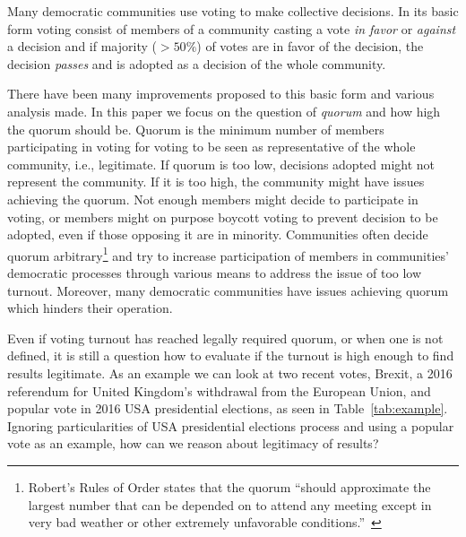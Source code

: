 \documentclass[chi_draft]{sigchi}
\begin{document}
Many democratic communities use voting to make collective decisions.
In its basic form voting consist of members of a community casting a vote \emph{in favor} or \emph{against} a decision and if
majority ($> 50\%$) of votes are in favor of the decision, the decision \emph{passes} and is adopted as a decision
of the whole community.

There have been many improvements proposed to this basic form and various analysis made.
In this paper we focus on the question of \emph{quorum} and how high the quorum should be.
Quorum is the minimum number of members participating in voting for voting to be seen as representative of the whole
community, i.e., legitimate.
If quorum is too low, decisions adopted might not represent the community.
If it is too high, the community might have issues achieving the quorum.
Not enough members might decide to participate in voting, or members might on purpose boycott voting to
prevent decision to be adopted, even if those opposing it are in minority.
Communities often decide quorum arbitrary\footnote{Robert's Rules of Order states that the quorum
``should approximate the largest number that can be depended on to attend any meeting except in very bad weather
or other extremely unfavorable conditions.''~\cite{roberts}}
and try to increase participation of members in communities' democratic processes through various means
to address the issue of too low turnout.
Moreover, many democratic communities have issues achieving quorum which hinders their operation.

Even if voting turnout has reached legally required quorum, or when one is not defined,
it is still a question how to evaluate if the turnout is high enough to find results legitimate.
As an example we can look at two recent votes, Brexit, a 2016 referendum for United Kingdom's withdrawal
from the European Union, and popular vote in 2016 USA presidential elections, as seen in Table~\ref{tab:example}.
Ignoring particularities of USA presidential elections process and using a popular vote as an example,
how can we reason about legitimacy of results?
\end{document}
